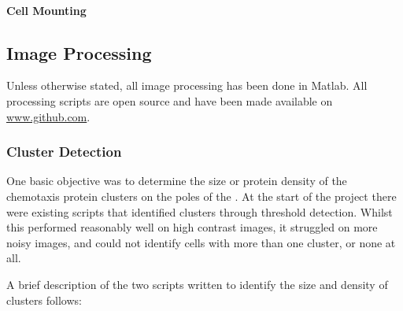 \documentclass[../main.tex]{subfiles}
\begin{document}
\paragraph{Cell Mounting}

\subsection{Image Processing}
\label{sec:methods:imageprocessing}
Unless otherwise stated, all image processing has been done in Matlab. All processing scripts are open source and have been made available on \url{www.github.com}.

\subsubsection{Cluster Detection}
One basic objective was to determine the size or protein density of the chemotaxis protein clusters on the poles of the \ecoli. At the start of the project there were existing scripts that identified clusters through threshold detection. Whilst this performed reasonably well on high contrast images, it struggled on more noisy images, and could not identify cells with more than one cluster, or none at all.

A brief description of the two scripts written to identify the size and density of clusters follows:
\end{document}
